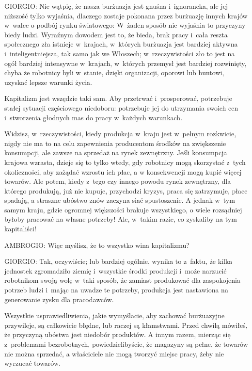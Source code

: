 \documentclass[oneside,polish,11pt,sfheadings]{mwbk}
\begin{document}
 
\noindent GIORGIO: Nie wątpię, że nasza burżuazja jest gnuśna i~ignorancka, ale jej niższość tylko wyjaśnia, dlaczego zostaje
pokonana przez burżuazję innych krajów w~walce o podbój rynku światowego: W~żaden sposób nie wyjaśnia to przyczyny
biedy ludzi. Wyraźnym dowodem jest to, że bieda, brak pracy i~cała reszta społecznego zła istnieje w~krajach, w~których
burżuazja jest bardziej aktywna i~inteligentniejsza, tak samo jak we Włoszech; w~rzeczywistości zło to jest na ogół
bardziej intensywne w~krajach, w~których przemysł jest bardziej rozwinięty, chyba że robotnicy byli w~stanie, dzięki
organizacji, oporowi lub buntowi, uzyskać lepsze warunki życia. 

 
Kapitalizm jest wszędzie taki sam.  Aby przetrwać i~prosperować, potrzebuje stałej sytuacji częściowego niedoboru:
potrzebuje jej do utrzymania swoich cen i~stworzenia głodnych mas do pracy w~każdych warunkach. 

 
Widzisz, w~rzeczywistości, kiedy produkcja w~kraju jest w~pełnym rozkwicie, nigdy nie ma to na celu zapewnienia
producentom środków na zwiększenie konsumpcji, ale zawsze na sprzedaż na rynek zewnętrzny. Jeśli konsumpcja krajowa
wzrasta, dzieje się to tylko wtedy, gdy robotnicy mogą skorzystać z~tych okoliczności, aby zażądać wzrostu ich płac, a
w konsekwencji mogą kupić więcej towarów. Ale potem, kiedy z~tego czy innego powodu rynek zewnętrzny, dla którego
produkują, już nie kupuje, przychodzi kryzys, praca się zatrzymuje, płace spadają, a straszne ubóstwo znów zaczyna siać
spustoszenie. A jednak w~tym samym kraju, gdzie ogromnej większości brakuje wszystkiego, o wiele rozsądniej byłoby
pracować na własne potrzeby! Ale, w~takim razie, co zyskaliby na tym kapitaliści! 




 
\noindent AMBROGIO: Więc myślisz, że to wszystko wina kapitalizmu? 




 
\noindent GIORGIO: Tak, oczywiście; lub bardziej ogólnie, wynika to z~faktu, że kilka jednostek zgromadziło ziemię i~wszystkie
środki produkcji i~może narzucić robotnikom swoją wolę w~taki sposób, że zamiast produkować dla zaspokojenia potrzeb
ludzi i~mając na uwadze te potrzeby, produkcja jest nastawiona na generowanie zysku dla pracodawców. 

 
Wszystkie usprawiedliwienia, jakie wymyślacie, aby zachować burżuazyjne przywileje, są całkowicie błędne, lub raczej są
kłamstwami. Przed chwilą mówiłeś, że przyczyną ubóstwa jest niedobór produktów. A innym razem, mierząc się z~problemami
bezrobotnych, powiedzielibyście, że magazyny są pełne, że towarów nie można sprzedać, a właściciele nie mogą tworzyć
miejsc pracy, żeby nie wyrzucać towarów. 
\end{document}
